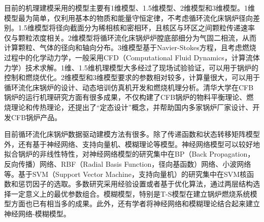 目前的机理建模采用的模型主要有1维模型、1.5维模型、2维模型和3维模型\cite{gungor2008}。1维模型最为简单，仅利用基本的物质和能量守恒定律，不考虑循环流化床锅炉径向差别。1.5维模型将径向截面分为稀相核和密相环，且核区与环区之间颗粒传递速率仅与颗粒浓度相关\cite{程从礼2002气固循环流化床能量最小多尺度环核}。2维模型将循环流化床锅炉炉膛底部细分为气固二相流，从而计算颗粒、气体的径向和轴向分布。3维模型基于Navier-Stokes方程，且考虑燃烧过程中的化学动力学，一般采用CFD（Computational Fluid Dynamics，计算流体力学）技术求解\cite{basu1999combustion}。1维、1.5维机理模型大多经过了现场试验验证，可以用于锅炉的控制和燃烧优化\cite{王新2008循环流化床动态建模及其预测控制研究}。2维模型和3维模型要求的参数相对较多，计算量很大，可以用于循环流化床锅炉的设计、动态培训仿真机开发和燃烧机理分析\cite{张晓磊2007循环流化床锅炉燃烧系统仿真}。清华大学在CFB锅炉的运行机理研究方面有很多成果，不仅构建了CFB锅炉的物料平衡理论、燃烧理论和传热理论，还提出了“定态设计”概念，并帮助国内多家锅炉厂家设计、开发CFB锅炉产品\cite{杨石2010基于流态重构的低能耗循环流化床锅炉技术,杨建华2009循环流化床锅炉改变床存量的燃烧试验}。

目前循环流化床锅炉数据驱动建模方法有很多。除了传递函数和状态转移矩阵模型外，还有基于神经网络、支持向量机、模糊理论等模型\cite{赵伟杰2007循环流化床锅炉床温的控制特性,樊诚2007循环流化床锅炉燃烧过程建模研究,李易平1991循环流化床锅炉床温及床压建模}。神经网络模型可以较好地拟合锅炉的非线性特性，对神经网络模型的研究集中在BP（Back Propagation，反向传播）网络、RBF（Radial Basis Function，径向基函数）网络、小波网络等\cite{pulluri2005wavelet}。基于SVM（Support Vector Machine，支持向量机）的研究集中在SVM核函数和惩罚因子的选取\cite{RePEc:eee:energy:v:124:y:2017:i:c:p:284-294}。多数研究采用经验设置或者基于优化算法，通过两层结构选择一定意义上的最优参数组合。模糊模型，特别是T-S模型在建立锅炉燃烧系统模型方面也已有相当多的成果。此外，还有学者将神经网络和模糊理论结合起来建立神经网络-模糊模型\cite{董湛波2012基于神经}。


